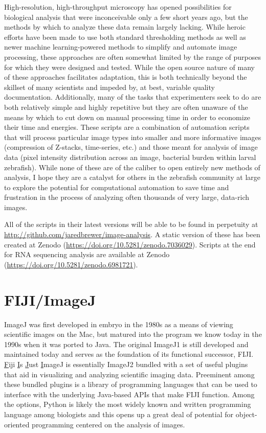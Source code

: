 High\hyp{}resolution, high\hyp{}throughput microscopy has opened possibilities for biological analysis that were inconceivable only a few short years ago, but the methods by which to analyze these data remain largely lacking. While heroic efforts have been made to use both standard thresholding methods as well as newer machine learning\hyp{}powered methods to simplify and automate image processing, these approaches are often somewhat limited by the range of purposes for which they were designed and tested. While the open source nature of many of these approaches facilitates adaptation, this is both technically beyond the skillset of many scientists and impeded by, at best, variable quality documentation. Additionally, many of the tasks that experimenters seek to do are both relatively simple and highly repetitive but they are often unaware of the means by which to cut down on manual processing time in order to economize their time and energies. These scripts are a combination of automation scripts that will process particular image types into smaller and more informative images (compression of Z\hyp{}stacks, time\hyp{}series, etc.) and those meant for analysis of image data (pixel intensity distribution across an image, bacterial burden within larval zebrafish). While none of these are of the caliber to open entirely new methods of analysis, I hope they are a catalyst for others in the zebrafish community at large to explore the potential for computational automation to save time and frustration in the process of analyzing often thousands of very large, data\hyp{}rich images.

All of the scripts in their latest versions will be able to be found in perpetuity at \url{http://github.com/jaredbrewer/image-analysis}. A static version of these has been created at Zenodo (\url{https://doi.org/10.5281/zenodo.7036029}). Scripts at the end for RNA sequencing analysis are available at Zenodo (\url{https://doi.org/10.5281/zenodo.6981721}). 

\section{FIJI/ImageJ}\label{fiji}

ImageJ was first developed in embryo in the 1980s as a means of viewing scientific images on the Mac, but matured into the program we know today in the 1990s when it was ported to Java. The original ImageJ1 is still developed and maintained today and serves as the foundation of its functional successor, FIJI. \underline{F}iji \underline{I}s \underline{J}ust \underline{I}mageJ is essentially ImageJ2 bundled with a set of useful plugins that aid in visualizing and analyzing scientific imaging data. Preeminent among these bundled plugins is a library of programming languages that can be used to interface with the underlying Java\hyp{}based APIs that make FIJI function. Among the options, Python is likely the most widely known and written programming language among biologists and this opens up a great deal of potential for object\hyp{}oriented programming centered on the analysis of images. 

